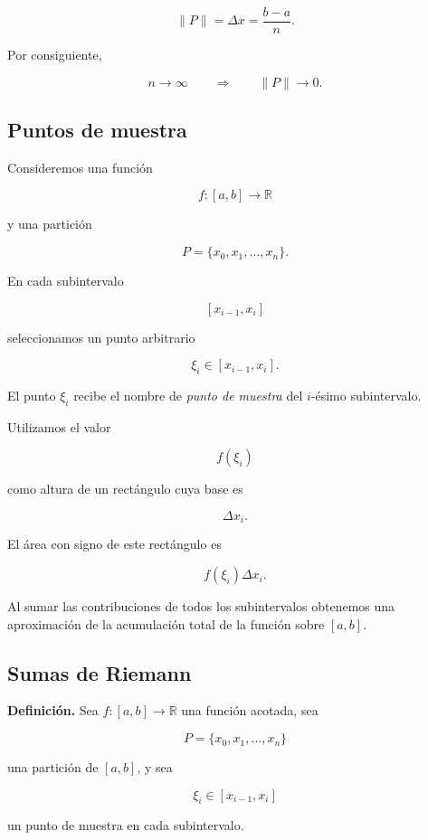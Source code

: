 \documentclass[12pt]{article}
\begin{document}
\[
\|P\|=\Delta x=\frac{b-a}{n}.
\]

Por consiguiente,

\[
n\longrightarrow\infty
\qquad\Longrightarrow\qquad
\|P\|\longrightarrow0.
\]

\subsection{Puntos de muestra}

Consideremos una función

\[
f:[a,b]\longrightarrow\mathbb{R}
\]

y una partición

\[
P=\{x_0,x_1,\ldots,x_n\}.
\]

En cada subintervalo

\[
[x_{i-1},x_i]
\]

seleccionamos un punto arbitrario

\[
\xi_i\in[x_{i-1},x_i].
\]

El punto $\xi_i$ recibe el nombre de \emph{punto de muestra} del
$i$-ésimo subintervalo.

Utilizamos el valor

\[
f(\xi_i)
\]

como altura de un rectángulo cuya base es

\[
\Delta x_i.
\]

El área con signo de este rectángulo es

\[
f(\xi_i)\Delta x_i.
\]

Al sumar las contribuciones de todos los subintervalos obtenemos una
aproximación de la acumulación total de la función sobre $[a,b]$.

\subsection{Sumas de Riemann}

\textbf{Definición.}
Sea $f:[a,b]\to\mathbb{R}$ una función acotada, sea

\[
P=\{x_0,x_1,\ldots,x_n\}
\]

una partición de $[a,b]$, y sea

\[
\xi_i\in[x_{i-1},x_i]
\]

un punto de muestra en cada subintervalo.
\end{document}

